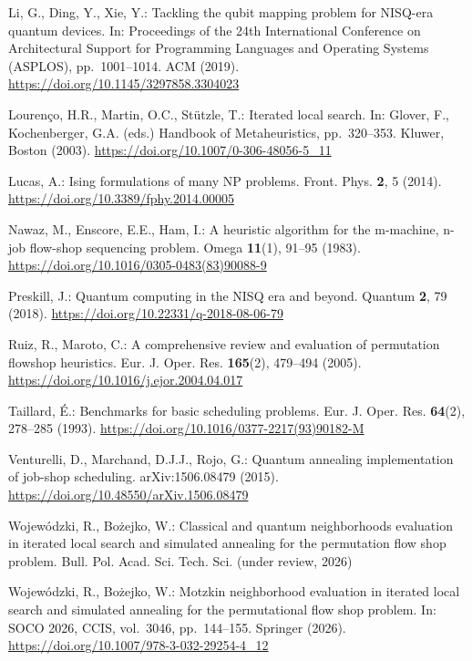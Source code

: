 \documentclass[11pt,a4paper]{article}
\newif\ifblind\blindfalse
\begin{document}
\begin{thebibliography}{22}
Li, G., Ding, Y., Xie, Y.: Tackling the qubit mapping problem for
NISQ-era quantum devices. In: Proceedings of the 24th International
Conference on Architectural Support for Programming Languages and
Operating Systems (ASPLOS), pp.\ 1001--1014. ACM (2019).
\url{https://doi.org/10.1145/3297858.3304023}

Louren\c{c}o, H.R., Martin, O.C., St\"{u}tzle, T.: Iterated local search.
In: Glover, F., Kochenberger, G.A. (eds.) Handbook of Metaheuristics,
pp.\ 320--353. Kluwer, Boston (2003).
\url{https://doi.org/10.1007/0-306-48056-5_11}

Lucas, A.: Ising formulations of many NP problems. Front. Phys.
\textbf{2}, 5 (2014). \url{https://doi.org/10.3389/fphy.2014.00005}

Nawaz, M., Enscore, E.E., Ham, I.: A heuristic algorithm for the
m-machine, n-job flow-shop sequencing problem. Omega \textbf{11}(1),
91--95 (1983). \url{https://doi.org/10.1016/0305-0483(83)90088-9}

Preskill, J.: Quantum computing in the NISQ era and beyond. Quantum
\textbf{2}, 79 (2018). \url{https://doi.org/10.22331/q-2018-08-06-79}

Ruiz, R., Maroto, C.: A comprehensive review and evaluation of
permutation flowshop heuristics. Eur. J. Oper. Res. \textbf{165}(2),
479--494 (2005). \url{https://doi.org/10.1016/j.ejor.2004.04.017}

Taillard, \'{E}.: Benchmarks for basic scheduling problems. Eur. J. Oper.
Res. \textbf{64}(2), 278--285 (1993).
\url{https://doi.org/10.1016/0377-2217(93)90182-M}

Venturelli, D., Marchand, D.J.J., Rojo, G.: Quantum annealing
implementation of job-shop scheduling. arXiv:1506.08479 (2015).
\url{https://doi.org/10.48550/arXiv.1506.08479}

\ifblind
[Authors omitted for blind review]: Classical and quantum neighborhoods
evaluation in iterated local search and simulated annealing for the
permutation flow shop problem. Bull. Pol. Acad. Sci. Tech. Sci.
(under review, 2026)
\else
Wojew\'{o}dzki, R., Bo\.{z}ejko, W.: Classical and quantum neighborhoods
evaluation in iterated local search and simulated annealing for the
permutation flow shop problem. Bull. Pol. Acad. Sci. Tech. Sci.
(under review, 2026)
\fi

\ifblind
[Authors omitted for blind review]: Motzkin neighborhood evaluation in
iterated local search and simulated annealing for the permutational
flow shop problem. In: SOCO 2026, CCIS, vol.\ 3046, pp.\ 144--155.
Springer (2026)
\else
Wojew\'{o}dzki, R., Bo\.{z}ejko, W.: Motzkin neighborhood evaluation in
iterated local search and simulated annealing for the permutational
flow shop problem. In: SOCO 2026, CCIS, vol.\ 3046, pp.\ 144--155.
Springer (2026). \url{https://doi.org/10.1007/978-3-032-29254-4_12}
\fi


\end{thebibliography}
\end{document}
